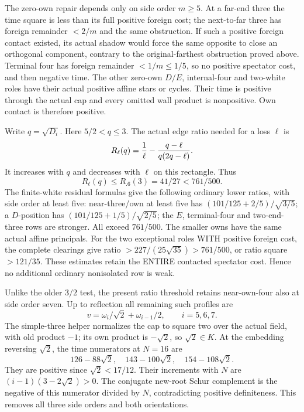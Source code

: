The zero-own repair depends only on side order \(m\ge5\).
At a far-end three the time square is less than its full positive
foreign cost; the next-to-far three has foreign remainder \(<2/m\)
and the same obstruction.
If such a positive foreign contact existed, its actual shadow
would force the same opposite to close an orthogonal component,
contrary to the original-farthest obstruction proved above.
Terminal four has foreign remainder \(<1/m\le1/5\), so no positive
spectator cost, and then negative time.
The other zero-own \(D/E\), internal-four and two-white roles
have their actual positive affine stars or cycles.
Their time is positive through the actual cap and every omitted
wall product is nonpositive.  Own contact is therefore positive.

Write \(q=\sqrt{D_i}\).  Here \(5/2<q\le3\).
The actual edge ratio needed for a loss \(\ell\) is
\[
 R_\ell(q)={1\over\ell}
                -{q-\ell\over q(2q-\ell)}.
\]
It increases with \(q\) and decreases with \(\ell\) on this
rectangle.  Thus
\[
 R_\ell(q)\le R_{.6}(3)=41/27<761/500.
\]
The finite-white residual formulas give the following ordinary
lower ratios, with side order at least five:
near-three/own at least five has
\((101/125+2/5)/\sqrt{3/5}\);
a \(D\)-position has
\((101/125+1/5)/\sqrt{2/5}\);
the \(E\), terminal-four and two-end-three rows are stronger.
All exceed \(761/500\).
The smaller owns have the same actual affine principals.
For the two exceptional roles WITH positive foreign cost,
the complete clearings give ratio
\(>227/(25\sqrt{35})>761/500\), or ratio square \(>121/35\).
These estimates retain the ENTIRE contacted spectator cost.
Hence no additional ordinary nonisolated row is weak.

Unlike the older \(3/2\) test, the present ratio threshold retains
near-own-four also at side order seven.  Up to reflection all
remaining such profiles are
\[
          v=\omega_i/\sqrt2+\omega_{i-1}/2,\qquad i=5,6,7 .
\]
The simple-three helper normalizes the cap to square two over the
actual field, with old product \(-1\); its own product is
\(-\sqrt2\), so \(\sqrt2\in K\).
At the embedding reversing \(\sqrt2\), the time numerators at
\(N=16\) are
\[
        126-88\sqrt2,\quad143-100\sqrt2,\quad154-108\sqrt2 .
\]
They are positive since \(\sqrt2<17/12\).
Their increments with \(N\) are
\((i-1)(3-2\sqrt2)>0\).
The conjugate new-root Schur complement is the negative of this
numerator divided by \(N\), contradicting positive definiteness.
This removes all three side orders and both orientations.

